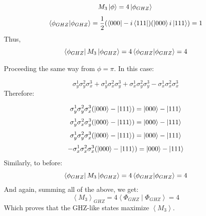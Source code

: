 \documentclass{article}
\begin{document}
\begin{equation*}
    M_3\ket{\phi}=4\ket{\phi_{GHZ}}\\
\end{equation*}
\begin{equation*}
    \braket{\phi_{GHZ}}=\frac{1}{2}(\bra{000}-i\bra{111})(\ket{000}i\ket{111})=1
\end{equation*}
Thus,
\begin{equation*}
    \bra{\phi_{GHZ}}M_3\ket{\phi_{GHZ}}=4\bra{\phi_{GHZ}}\ket{\phi_{GHZ}}=4
\end{equation*}
\pagebreak

Proceeding the same way from $\phi=\pi$. In this case:

\begin{equation}
\sigma_{y}^{1} \sigma_{y}^{2} \sigma_{x}^{3}+\sigma_{y}^{1} \sigma_{x}^{2} \sigma_{y}^{3}+\sigma_{x}^{1} \sigma_{y}^{2} \sigma_{y}^{3}-\sigma_{x}^{1} \sigma_{x}^{2} \sigma_{x}^{3}
\end{equation}
Therefore:

\begin{equation*}
    \sigma^1_y\sigma^2_y\sigma^3_x(\ket{000}-\ket{111})=\ket{000}-\ket{111}
\end{equation*}
\begin{equation*}
     \sigma^1_y\sigma^2_x\sigma^3_y(\ket{000}-\ket{111})=\ket{000}-\ket{111}   
\end{equation*}
\begin{equation*}
     \sigma^1_y\sigma^2_y\sigma^3_x(\ket{000}-\ket{111})=\ket{000}-\ket{111}
\end{equation*}
\begin{equation*}
     -\sigma^1_x\sigma^2_x\sigma^3_x(\ket{000}-\ket{111})=\ket{000}-\ket{111}  
\end{equation*}
Similarly, to before:
\begin{equation*}
    \bra{\phi_{GHZ}}M_3\ket{\phi_{GHZ}}=4\bra{\phi_{GHZ}}\ket{\phi_{GHZ}}=4
\end{equation*}
And again, summing all of the above, we get:
$$
\left\langle M_{3}\right\rangle_{G H Z}=4\left\langle\Phi_{G H Z} \mid \Phi_{G H Z}\right\rangle=4
$$
Which proves that the GHZ-like states maximize $\left\langle M_{3}\right\rangle$.
\end{document}
